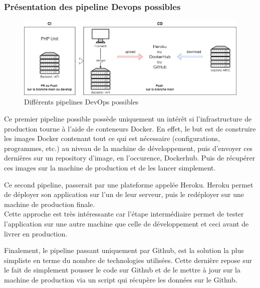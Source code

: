 \documentclass[
    iai, %
    il, %
]{heig-tb}
\begin{document}
\subsubsection{Présentation des pipeline Devops possibles}

\begin{center}
    \begin{figure}
        \includegraphics[width=\textwidth]{./assets/figures/devops-choix.drawio.png}
        \caption{Différents pipelines DevOps possibles \label{devops-choix.drawio}}
    \end{figure}
\end{center}

Ce premier pipeline possible possède uniquement un intérêt si l'infrastructure de production tourne
à l'aide de conteneurs Docker. En effet, le but est de construire les images Docker contenant tout
ce qui est nécessaire (configurations, programmes, etc.) au niveau de la machine de développement,
puis d'envoyer ces dernières sur un repository d'image, en l'occurence, Dockerhub. Puis de
récupérer ces images sur la machine de production et de les lancer simplement.

Ce second pipeline, passerait par une plateforme appelée Heroku. Heroku permet de déployer son application sur l'un de leur serveur, puis le redéployer sur une machine de production finale.\\
Cette approche est très intéressante car l'étape intermédiaire permet de tester l'application sur une autre machine que celle de développement et ceci avant de livrer en production.

Finalement, le pipeline passant uniquement par Github, est la solution la plus simpliste en terme du nombre de technologies utilisées. Cette dernière repose sur le fait de simplement pousser le code sur Github et de le mettre à jour sur la machine de production via un script qui récupère les données sur le Github.
\end{document}
